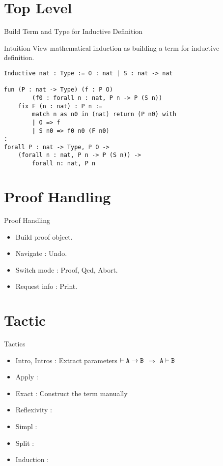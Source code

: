 \documentclass[UTF-8]{beamer}
\begin{document}
\section{Top Level}
\begin{frame}[fragile]{Build Term and Type for Inductive Definition}
\begin{exampleblock}{Intuition}
    View mathematical induction as building a term for inductive definition.
\end{exampleblock}

\begin{verbatim}
Inductive nat : Type := O : nat | S : nat -> nat

fun (P : nat -> Type) (f : P O) 
        (f0 : forall n : nat, P n -> P (S n)) 
    fix F (n : nat) : P n :=
        match n as n0 in (nat) return (P n0) with
        | O => f
        | S n0 => f0 n0 (F n0)
:
forall P : nat -> Type, P O -> 
    (forall n : nat, P n -> P (S n)) -> 
        forall n: nat, P n
\end{verbatim}
\end{frame}

\section{Proof Handling}
\begin{frame}{Proof Handling}
    \begin{itemize}
    \item Build proof object.
    \item Navigate : Undo.
    \item Switch mode : Proof, Qed, Abort.
    \item Request info : Print.
    \end{itemize}
\end{frame}

\section{Tactic}
\begin{frame}{Tactics}
\begin{itemize}
\item Intro, Intros : Extract parameters \quad $\tt \vdash A\to B$ $\Rightarrow$ $\tt A\vdash B$
\item Apply :
\item Exact : Construct the term manually
\item Reflexivity : 
\item Simpl : 
\item Split :
\item Induction :
\end{itemize}
\end{frame}
\end{document}
